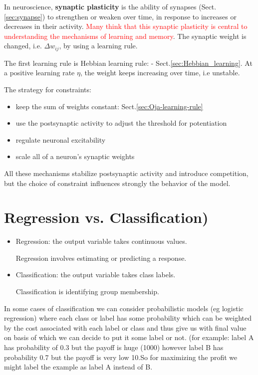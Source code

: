 In neuroscience, {\bf synaptic plasticity} is the ability of synapses
(Sect.\ref{sec:synapse}) to strengthen or weaken over time, in response to
increases or decreases in their activity. 
\textcolor{red}{Many think that this synaptic plasticity is central to
understanding the mechanisms of learning and memory}.
The synaptic weight is changed, i.e. $\Delta w_{ij}$, by using a learning rule.

The first learning rule is Hebbian learning rule: -
Sect.\ref{sec:Hebbian_learning}. At a positive learning rate $\eta$, 
the weight keeps increasing over time, i.e unstable. 

The strategy for constraints:
\begin{itemize}
  \item keep the sum of weights constant: Sect.\ref{sec:Oja-learning-rule}
  
  \item use the postsynaptic activity to adjust the threshold for potentiation

  \item regulate neuronal excitability
  
  \item scale all of a neuron's synaptic weights
\end{itemize}
All these mechanisms stabilize postsynaptic activity and introduce
competition, but the choice of constraint influences strongly the
behavior of the model.



\section{Regression vs. Classification)}

\begin{itemize}
  \item  Regression: the output variable takes continuous values.

Regression involves estimating or predicting a response. 

 \item Classification: the output variable takes class labels.

Classification is identifying group membership.  
\end{itemize}


In some cases of classification we can consider probabilistic models (eg
logistic regression) where each class or label has some probability which can be
weighted by the cost associated with each label or class and thus give us with
final value on basis of which we can decide to put it some label or not.
(for example: label A has probability of 0.3 but the payoff is huge (1000)
however label B has probability 0.7 but the payoff is very low 10.So for
maximizing the profit we might label the example as label A instead of B.


